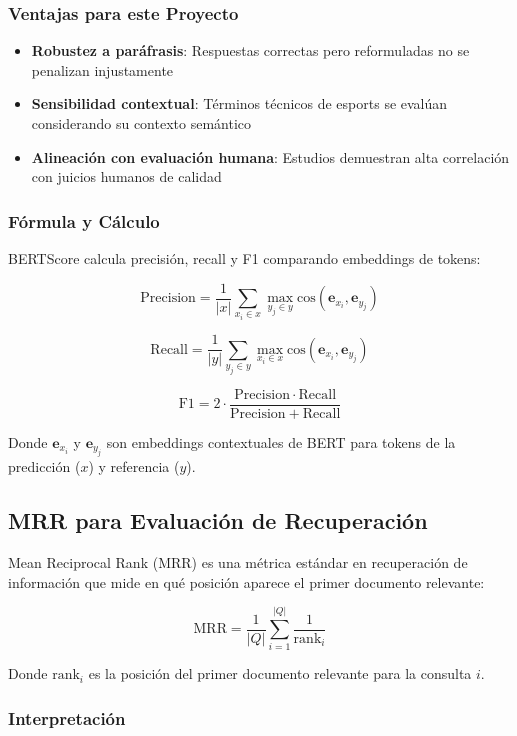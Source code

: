 \subsubsection{Ventajas para este Proyecto}

\begin{itemize}
    \item \textbf{Robustez a paráfrasis}: Respuestas correctas pero reformuladas no se penalizan injustamente
    \item \textbf{Sensibilidad contextual}: Términos técnicos de esports se evalúan considerando su contexto semántico
    \item \textbf{Alineación con evaluación humana}: Estudios demuestran alta correlación con juicios humanos de calidad~\cite{zhang2019bertscore}
\end{itemize}

\subsubsection{Fórmula y Cálculo}

BERTScore calcula precisión, recall y F1 comparando embeddings de tokens:

\[
\mathrm{Precision} = \frac{1}{|x|} \sum_{x_i \in x} \max_{y_j \in y} \mathrm{cos}(\mathbf{e}_{x_i}, \mathbf{e}_{y_j})
\]

\[
\mathrm{Recall} = \frac{1}{|y|} \sum_{y_j \in y} \max_{x_i \in x} \mathrm{cos}(\mathbf{e}_{x_i}, \mathbf{e}_{y_j})
\]

\[
\mathrm{F1} = 2 \cdot \frac{\mathrm{Precision} \cdot \mathrm{Recall}}{\mathrm{Precision} + \mathrm{Recall}}
\]

Donde $\mathbf{e}_{x_i}$ y $\mathbf{e}_{y_j}$ son embeddings contextuales de BERT para tokens de la predicción ($x$) y referencia ($y$).

\subsection{MRR para Evaluación de Recuperación}

Mean Reciprocal Rank (MRR) es una métrica estándar en recuperación de información que mide en qué posición aparece el primer documento relevante:

\[
\mathrm{MRR} = \frac{1}{|Q|} \sum_{i=1}^{|Q|} \frac{1}{\mathrm{rank}_i}
\]

Donde $\mathrm{rank}_i$ es la posición del primer documento relevante para la consulta $i$.

\subsubsection{Interpretación}

